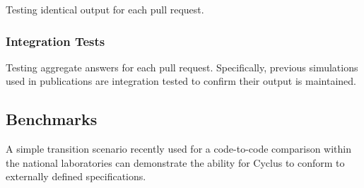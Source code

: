 Testing identical output for each pull request.

\subsubsection{Integration Tests} 

Testing aggregate answers for each pull request. Specifically, previous
simulations used in publications are integration tested to confirm their output
is maintained.

\subsection{Benchmarks}

A simple transition scenario recently used for a code-to-code comparison within 
the national laboratories can demonstrate the ability for Cyclus to conform to 
externally defined specifications.
